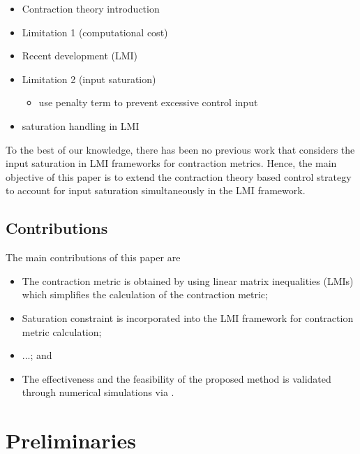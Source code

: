 \documentclass{ifacconf}
\newcommand{\ctxt}[2]{{\color{#1}{#2}\color{black}}}
\newcommand{\cred}[1]{{\ctxt{awesome}{#1}}}
\newcommand{\cblue}[1]{{\ctxt{airforceblue}{#1}}}
\begin{document}
\cred{\lipsum[1-6]}

\cblue{
   \begin{itemize}
      \item 포화에 대한 사전 연구 더해서 비교
      \item S.S.Ge의 논문 참고 
   \end{itemize}
}

\begin{itemize}
   \item Contraction theory introduction
   \item Limitation 1 (computational cost)
   \item Recent development (LMI)
   \item Limitation 2 (input saturation)
   \begin{itemize}
      \item use penalty term to prevent excessive control input
   \end{itemize}
   \item saturation handling in LMI
\end{itemize}

To the best of our knowledge, there has been no previous work that considers the input saturation in LMI frameworks for contraction metrics.
Hence, the main objective of this paper is to extend the contraction theory based control strategy to account for input saturation simultaneously in the LMI framework.

\subsection{Contributions}

The main contributions of this paper are 
\begin{itemize}
   \item The contraction metric is obtained by using linear matrix inequalities (LMIs) which simplifies the calculation of the contraction metric;
   \item Saturation constraint is incorporated into the LMI framework for contraction metric calculation;
   \item ...; and
   \item The effectiveness and the feasibility of the proposed method is validated through numerical simulations via \cred{Lorenz system}.
\end{itemize}


\section{Preliminaries}
\end{document}
